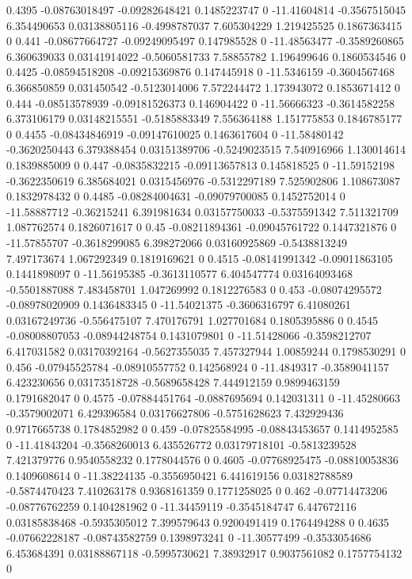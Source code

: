 {0.4395 -0.08763018497 -0.09282648421 0.1485223747 0 -11.41604814 -0.3567515045 6.354490653 0.03138805116 -0.4998787037 7.605304229 1.219425525 0.1867363415 0
0.441 -0.08677664727 -0.09249095497 0.147985528 0 -11.48563477 -0.3589260865 6.360639033 0.03141914022 -0.5060581733 7.58855782 1.196499646 0.1860534546 0
0.4425 -0.08594518208 -0.09215369876 0.147445918 0 -11.5346159 -0.3604567468 6.366850859 0.031450542 -0.5123014006 7.572244472 1.173943072 0.1853671412 0
0.444 -0.08513578939 -0.09181526373 0.146904422 0 -11.56666323 -0.3614582258 6.373106179 0.03148215551 -0.5185883349 7.556364188 1.151775853 0.1846785177 0
0.4455 -0.08434846919 -0.09147610025 0.1463617604 0 -11.58480142 -0.3620250443 6.379388454 0.03151389706 -0.5249023515 7.540916966 1.130014614 0.1839885009 0
0.447 -0.0835832215 -0.09113657813 0.145818525 0 -11.59152198 -0.3622350619 6.385684021 0.0315456976 -0.5312297189 7.525902806 1.108673087 0.1832978432 0
0.4485 -0.08284004631 -0.09079700085 0.1452752014 0 -11.58887712 -0.36215241 6.391981634 0.03157750033 -0.5375591342 7.511321709 1.087762574 0.1826071617 0
0.45 -0.08211894361 -0.09045761722 0.1447321876 0 -11.57855707 -0.3618299085 6.398272066 0.03160925869 -0.5438813249 7.497173674 1.067292349 0.1819169621 0
0.4515 -0.08141991342 -0.09011863105 0.1441898097 0 -11.56195385 -0.3613110577 6.404547774 0.03164093468 -0.5501887088 7.483458701 1.047269992 0.1812276583 0
0.453 -0.08074295572 -0.08978020909 0.1436483345 0 -11.54021375 -0.3606316797 6.41080261 0.03167249736 -0.556475107 7.470176791 1.027701684 0.1805395886 0
0.4545 -0.08008807053 -0.08944248754 0.1431079801 0 -11.51428066 -0.3598212707 6.417031582 0.03170392164 -0.5627355035 7.457327944 1.00859244 0.1798530291 0
0.456 -0.07945525784 -0.08910557752 0.142568924 0 -11.4849317 -0.3589041157 6.423230656 0.03173518728 -0.5689658428 7.444912159 0.9899463159 0.1791682047 0
0.4575 -0.07884451764 -0.0887695694 0.142031311 0 -11.45280663 -0.3579002071 6.429396584 0.03176627806 -0.5751628623 7.432929436 0.9717665738 0.1784852982 0
0.459 -0.07825584995 -0.08843453657 0.1414952585 0 -11.41843204 -0.3568260013 6.435526772 0.03179718101 -0.5813239528 7.421379776 0.9540558232 0.1778044576 0
0.4605 -0.07768925475 -0.08810053836 0.1409608614 0 -11.38224135 -0.3556950421 6.441619156 0.03182788589 -0.5874470423 7.410263178 0.9368161359 0.1771258025 0
0.462 -0.07714473206 -0.08776762259 0.1404281962 0 -11.34459119 -0.3545184747 6.447672116 0.03185838468 -0.5935305012 7.399579643 0.9200491419 0.1764494288 0
0.4635 -0.07662228187 -0.08743582759 0.1398973241 0 -11.30577499 -0.3533054686 6.453684391 0.03188867118 -0.5995730621 7.38932917 0.9037561082 0.1757754132 0
}

